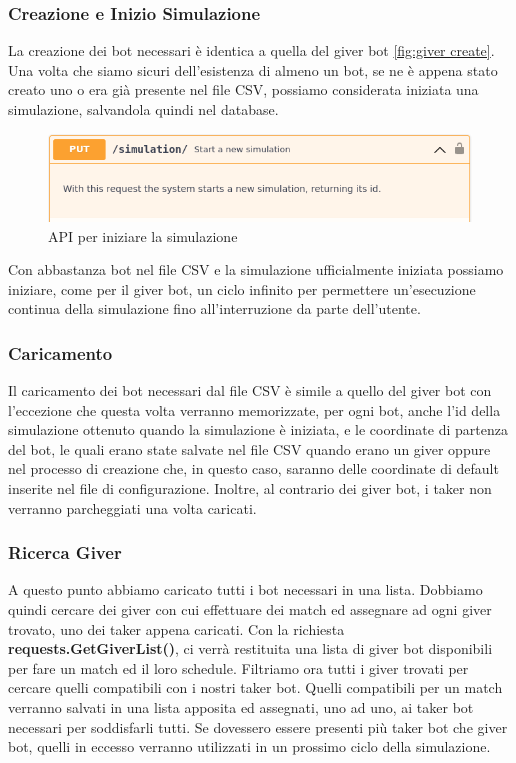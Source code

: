 \documentclass[main.tex]{subfiles}
\begin{document}
\subsubsection{Creazione e Inizio Simulazione}
La creazione dei bot necessari è identica a quella del giver bot \ref{fig:giver create}. \newline
Una volta che siamo sicuri dell'esistenza di almeno un bot, se ne è appena stato creato uno o era già presente nel file CSV, possiamo considerata iniziata una simulazione, salvandola quindi nel database.

\begin{figure}[H]
    \centering
    \includegraphics[width=1\linewidth]{img/simulazione/takerbot/simulazione-start-api.png}
    \caption{API per iniziare la simulazione}
    \label{fig:simulazione start api}
\end{figure}
Con abbastanza bot nel file CSV e la simulazione ufficialmente iniziata possiamo iniziare, come per il giver bot, un ciclo infinito per permettere un'esecuzione continua della simulazione fino all'interruzione da parte dell'utente. 

\subsubsection{Caricamento}\label{takerload}
Il caricamento dei bot necessari dal file CSV è simile a quello del giver bot con l'eccezione che questa volta verranno memorizzate, per ogni bot, anche l'id della simulazione ottenuto quando la simulazione è iniziata, e le coordinate di partenza del bot, le quali erano state salvate nel file CSV quando erano un giver oppure nel processo di creazione che, in questo caso, saranno delle coordinate di default inserite nel file di configurazione. Inoltre, al contrario dei giver bot, i taker non verranno parcheggiati una volta caricati.

\subsubsection{Ricerca Giver}
A questo punto abbiamo caricato tutti i bot necessari in una lista. Dobbiamo quindi cercare dei giver con cui effettuare dei match ed assegnare ad ogni giver trovato, uno dei taker appena caricati. \newline
Con la richiesta \textbf{requests.GetGiverList()}, ci verrà restituita una lista di giver bot disponibili per fare un match ed il loro schedule. Filtriamo ora tutti i giver trovati per cercare quelli compatibili con i nostri taker bot. Quelli compatibili per un match verranno salvati in una lista apposita ed assegnati, uno ad uno, ai taker bot necessari per soddisfarli tutti. Se dovessero essere presenti più taker bot che giver bot, quelli in eccesso verranno utilizzati in un prossimo ciclo della simulazione.
\end{document}
